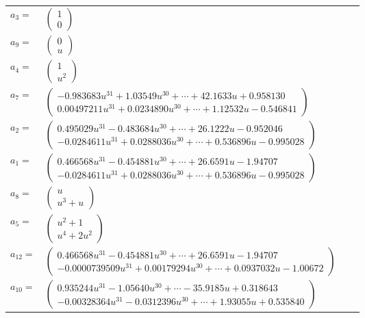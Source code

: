 \documentclass[1p]{elsarticle_modified}
\theoremstyle{definition}
\begin{document}
\begin{tabular}{m{7pt} m{180pt} m{7pt} m{180pt} }
\flushright $a_{3}=$&$\begin{pmatrix}1\\0\end{pmatrix}$ \\
\flushright $a_{9}=$&$\begin{pmatrix}0\\u\end{pmatrix}$ \\
\flushright $a_{4}=$&$\begin{pmatrix}1\\u^2\end{pmatrix}$ \\
\flushright $a_{7}=$&$\begin{pmatrix}-0.983683 u^{31}+1.03549 u^{30}+\cdots+42.1633 u+0.958130\\0.00497211 u^{31}+0.0234890 u^{30}+\cdots+1.12532 u-0.546841\end{pmatrix}$ \\
\flushright $a_{2}=$&$\begin{pmatrix}0.495029 u^{31}-0.483684 u^{30}+\cdots+26.1222 u-0.952046\\-0.0284611 u^{31}+0.0288036 u^{30}+\cdots+0.536896 u-0.995028\end{pmatrix}$ \\
\flushright $a_{1}=$&$\begin{pmatrix}0.466568 u^{31}-0.454881 u^{30}+\cdots+26.6591 u-1.94707\\-0.0284611 u^{31}+0.0288036 u^{30}+\cdots+0.536896 u-0.995028\end{pmatrix}$ \\
\flushright $a_{8}=$&$\begin{pmatrix}u\\u^3+u\end{pmatrix}$ \\
\flushright $a_{5}=$&$\begin{pmatrix}u^2+1\\u^4+2 u^2\end{pmatrix}$ \\
\flushright $a_{12}=$&$\begin{pmatrix}0.466568 u^{31}-0.454881 u^{30}+\cdots+26.6591 u-1.94707\\-0.0000739509 u^{31}+0.00179294 u^{30}+\cdots+0.0937032 u-1.00672\end{pmatrix}$ \\
\flushright $a_{10}=$&$\begin{pmatrix}0.935244 u^{31}-1.05640 u^{30}+\cdots-35.9185 u+0.318643\\-0.00328364 u^{31}-0.0312396 u^{30}+\cdots+1.93055 u+0.535840\end{pmatrix}$ \\

\end{tabular}
\end{document}
